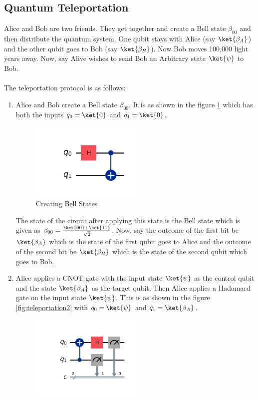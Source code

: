 \documentclass[12pt, oneside]{book}
\theoremstyle{definition}
\theoremstyle{definition}
\theoremstyle{remark}
\begin{document}
\subsection{Quantum Teleportation}
Alice and Bob are two friends. 
They get together and create a Bell state $\beta_{00}$ and then 
distribute the quantum system. One qubit stays with Alice (say $\ket{\beta_A}$) 
and the other qubit goes to Bob (say $\ket{\beta_B}$).
Now Bob moves 100,000 light years away. Now, say Alive wishes to send Bob an Arbitrary state $\ket{\psi}$ to Bob.\\
\\
The teleportation protocol is as follows:
\begin{enumerate}
    \item Alice and Bob create a Bell state $\beta_{00}$. It is as shown in the figure \ref{fig:teleportation1} which has both the inputs $q_0=\ket{0}$ and $q_1=\ket{0}$.
    \begin{figure}[H]
        \centering
        \includegraphics[width=0.5\textwidth]{../images/teleportation1.png}
        \caption{Creating Bell States}
        \label{fig:teleportation1}
    \end{figure}
    The state of the circuit after applying this state is the Bell state which is given as $\beta_{00}=\frac{\ket{00}+\ket{11}}{\sqrt{2}}$.
    Now, say the outcome of the first bit be $\ket{\beta_A}$ which is the state of the first qubit goes to Alice and the outcome of the second bit be $\ket{\beta_B}$ which is the state of the second qubit which goes to Bob.
    \item Alice applies a CNOT gate with the input state $\ket{\psi}$ as the control qubit and the state $\ket{\beta_A}$ as the target qubit. Then Alice applies a Hadamard gate on the input state $\ket{\psi}$. This is as shown in the figure \ref{fig:teleportation2} with $q_0=\ket{\psi}$ and $q_1=\ket{\beta_A}$.
    \begin{figure}[H]
        \centering
        \includegraphics[width=0.5\textwidth]{../images/teleportation2.png}

\end{figure}
\end{enumerate}
\end{document}
